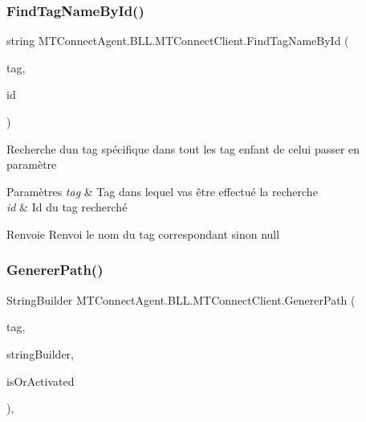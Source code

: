 \subsubsection{\texorpdfstring{Find\+Tag\+Name\+By\+Id()}{FindTagNameById()}}
{\footnotesize\ttfamily string M\+T\+Connect\+Agent.\+B\+L\+L.\+M\+T\+Connect\+Client.\+Find\+Tag\+Name\+By\+Id (\begin{DoxyParamCaption}\item[{\mbox{\hyperlink{class_m_t_connect_agent_1_1_model_1_1_tag}{Tag}}}]{tag,  }\item[{string}]{id }\end{DoxyParamCaption})\hspace{0.3cm}{\ttfamily [inline]}}



Recherche d\textquotesingle{}un tag spécifique dans tout les tag enfant de celui passer en paramètre 


\begin{DoxyParams}{Paramètres}
{\em tag} & Tag dans lequel vas être effectué la recherche\\
\hline
{\em id} & Id du tag recherché\\
\hline
\end{DoxyParams}
\begin{DoxyReturn}{Renvoie}
Renvoi le nom du tag correspondant sinon null
\end{DoxyReturn}
\mbox{\label{class_m_t_connect_agent_1_1_b_l_l_1_1_m_t_connect_client_ad38815a224cb788630db2a3eb09d84c7}} 
\subsubsection{\texorpdfstring{Generer\+Path()}{GenererPath()}\hspace{0.1cm}{\footnotesize\ttfamily [1/2]}}
{\footnotesize\ttfamily String\+Builder M\+T\+Connect\+Agent.\+B\+L\+L.\+M\+T\+Connect\+Client.\+Generer\+Path (\begin{DoxyParamCaption}\item[{\mbox{\hyperlink{class_m_t_connect_agent_1_1_model_1_1_tag}{Tag}}}]{tag,  }\item[{String\+Builder}]{string\+Builder,  }\item[{bool}]{is\+Or\+Activated }\end{DoxyParamCaption})\hspace{0.3cm}{\ttfamily [inline]}, {\ttfamily [private]}}



